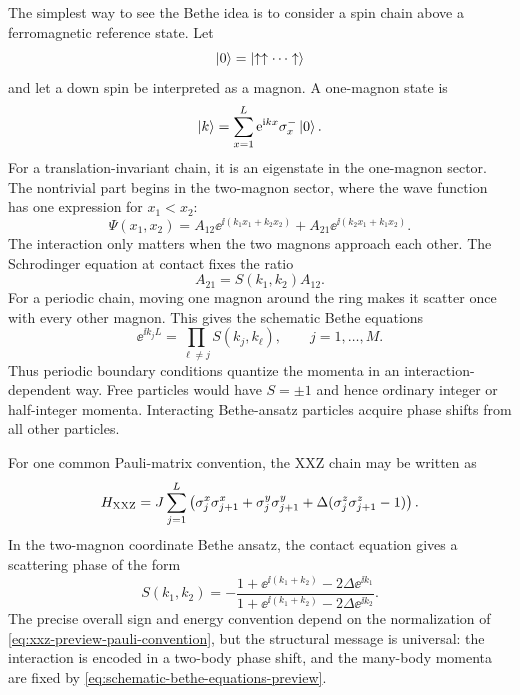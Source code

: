 The simplest way to see the Bethe idea is to consider a spin chain above a
ferromagnetic reference state.  Let
\begin{equation}
    \left|0\right\rangle=\left|\uparrow\uparrow\cdots\uparrow\right\rangle
\end{equation}
and let a down spin be interpreted as a magnon.  A one-magnon state is
\begin{equation}
    \left|k\right\rangle=\sum_{x=1}^{L}\mathrm{e}^{\mathrm{i} kx}\sigma_x^-\left|0\right\rangle .
\end{equation}
For a translation-invariant chain, it is an eigenstate in the one-magnon sector.
The nontrivial part begins in the two-magnon sector, where the wave function has
one expression for $x_1<x_2$:
\begin{equation}
\label{eq:two-magnon-wavefunction-preview}
    \Psi(x_1,x_2)
    =A_{12}\ee^{\ii(k_1x_1+k_2x_2)}
    +A_{21}\ee^{\ii(k_2x_1+k_1x_2)} .
\end{equation}
The interaction only matters when the two magnons approach each other.  The
Schrodinger equation at contact fixes the ratio
\begin{equation}
\label{eq:two-magnon-S-preview}
    A_{21}=S(k_1,k_2)A_{12} .
\end{equation}
For a periodic chain, moving one magnon around the ring makes it scatter once
with every other magnon.  This gives the schematic Bethe equations
\begin{equation}
\label{eq:schematic-bethe-equations-preview}
    \ee^{\ii k_j L}
    =
    \prod_{\ell\neq j}S(k_j,k_\ell),
    \qquad j=1,\ldots,M .
\end{equation}
Thus periodic boundary conditions quantize the momenta in an interaction-dependent
way.  Free particles would have $S=\pm1$ and hence ordinary integer or
half-integer momenta.  Interacting Bethe-ansatz particles acquire phase shifts
from all other particles.

\begin{example}
For one common Pauli-matrix convention, the XXZ chain may be written as
\begin{equation}
\label{eq:xxz-preview-pauli-convention}
    H_{\rm XXZ}
    =
    J\sum_{j=1}^{L}
    \left(
    \sigma_j^x\sigma_{j+1}^x
    +\sigma_j^y\sigma_{j+1}^y
    +\Delta(\sigma_j^z\sigma_{j+1}^z-1)
    \right).
\end{equation}
In the two-magnon coordinate Bethe ansatz, the contact equation gives a scattering
phase of the form
\begin{equation}
\label{eq:xxz-momentum-S-preview}
    S(k_1,k_2)
    =-
    \frac{1+\ee^{\ii(k_1+k_2)}-2\Delta\ee^{\ii k_1}}
         {1+\ee^{\ii(k_1+k_2)}-2\Delta\ee^{\ii k_2}} .
\end{equation}
The precise overall sign and energy convention depend on the normalization of
\cref{eq:xxz-preview-pauli-convention}, but the structural message is universal:
the interaction is encoded in a two-body phase shift, and the many-body momenta
are fixed by \cref{eq:schematic-bethe-equations-preview}.
\end{example}

